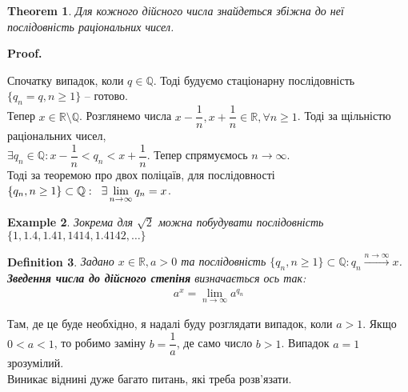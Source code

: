 \documentclass[a4paper, 14pt]{article}
\makeatletter
\def\qed{$\blacksquare$}
\theoremstyle{theoremdd}
\newtheorem{theorem}{Theorem}[subsection]
\theoremstyle{theoremdd}
\newtheorem{definition}[theorem]{Definition}
\theoremstyle{theoremdd}
\theoremstyle{theoremdd}
\newtheorem{example}[theorem]{Example}
\theoremstyle{theoremdd}
\theoremstyle{theoremdd}
\theoremstyle{theoremdd}
\theoremstyle{theoremdd}
\renewenvironment{proof}[1][Proof.\\]{\par
\pushQED{\hfill \qed}%
\normalfont \topsep6\p@\@plus6\p@\relax
\trivlist
\item\relax
{\bfseries
#1\@addpunct{.}}\hspace\labelsep\ignorespaces
}{%
\popQED\endtrivlist\@endpefalse
}
\makeatother
\begin{document}
\begin{theorem}
	Для кожного дійсного числа знайдеться збіжна до неї послідовність раціональних чисел.
\end{theorem}
	
	\begin{proof}
	Спочатку випадок, коли $q \in \mathbb{Q}$. Тоді будуємо стаціонарну послідовність $\{q_n = q, n \geq 1\}$ -- готово.
	\bigskip \\
	Тепер $x \in \mathbb{R} \setminus \mathbb{Q}$. Розглянемо числа $x - \dfrac{1}{n}, x + \dfrac{1}{n} \in \mathbb{R}, \forall n \geq 1$. Тоді за щільністю раціональних чисел,\\
	$\exists q_n \in \mathbb{Q}: x - \dfrac{1}{n} < q_n < x + \dfrac{1}{n}$. Тепер спрямуємось $n \to \infty$. \\
	Тоді за теоремою про двох поліцаїв, для послідовності $\{q_n, n \geq 1\} \subset \mathbb{Q}: \hspace{0.2cm} \exists \displaystyle\lim_{n \to \infty} q_n = x$.
	\end{proof}
	
	\begin{example}
	Зокрема для $\sqrt{2}$ можна побудувати послідовність $\{1,1.4,1.41,1414,1.4142,\dots\}$
	\end{example}
	
	\iffalse %
	\begin{theorem}
	Для будь-якого раціонального числа знайдеться збіжна до неї послідовність ірраціональних чисел.\\
	\textit{Доводиться аналогічно, із використанням щільності ірраціональних чисел.}
	\end{theorem}
	\fi

\begin{definition}
Задано $x \in \mathbb{R}, a > 0$ та послідовність $\{q_n, n \geq 1\} \subset \mathbb{Q}: q_n \xrightarrow{n \to \infty} x$.\\
\textbf{Зведення числа до дійсного степіня} визначається ось так:
\begin{align*}
a^x = \displaystyle\lim_{n \to \infty} a^{q_n}
\end{align*}
\end{definition}

Там, де це буде необхідно, я надалі буду розглядати випадок, коли $a > 1$. Якщо $0 < a < 1$, то робимо заміну $b = \dfrac{1}{a}$, де само число $b > 1$. Випадок $a = 1$ зрозумілий.\\
Виникає віднині дуже багато питань, які треба розв'язати.
\end{document}
